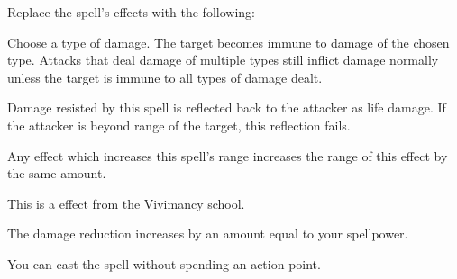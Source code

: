 Replace the spell's effects with the following:
\begin{spellcontent}

\begin{augmenteffects}



\spelleffect
Choose a type of damage.
The target becomes immune to damage of the chosen type.
Attacks that deal damage of multiple types still inflict damage normally unless the target is immune to all types of damage dealt.






\end{augmenteffects}

\end{spellcontent}






Damage resisted by this spell is reflected back to the attacker as life damage.
If the attacker is beyond \rngclose range of the target, this reflection fails.
\par Any effect which increases this spell's range increases the range of this effect by the same amount.



\par


This is a  effect from the Vivimancy school.



The damage reduction increases by an amount equal to your spellpower.






You can cast the spell without spending an action point.








